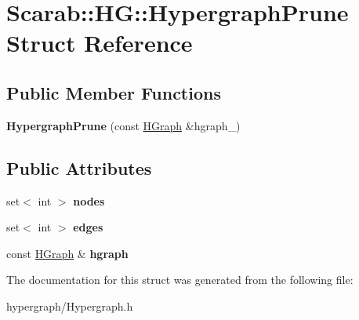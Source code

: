 \hypertarget{struct_scarab_1_1_h_g_1_1_hypergraph_prune}{
\section{Scarab::HG::HypergraphPrune Struct Reference}
\label{struct_scarab_1_1_h_g_1_1_hypergraph_prune}
}
\subsection*{Public Member Functions}
\begin{DoxyCompactItemize}
\item 
\hypertarget{struct_scarab_1_1_h_g_1_1_hypergraph_prune_adc29528f39ad9ced03be8b48341c3e84}{
{\bfseries HypergraphPrune} (const \hyperlink{class_scarab_1_1_h_g_1_1_h_graph}{HGraph} \&hgraph\_\-)}
\label{struct_scarab_1_1_h_g_1_1_hypergraph_prune_adc29528f39ad9ced03be8b48341c3e84}

\end{DoxyCompactItemize}
\subsection*{Public Attributes}
\begin{DoxyCompactItemize}
\item 
\hypertarget{struct_scarab_1_1_h_g_1_1_hypergraph_prune_a1ff0fd7b723f888db33ae542d186d0b4}{
set$<$ int $>$ {\bfseries nodes}}
\label{struct_scarab_1_1_h_g_1_1_hypergraph_prune_a1ff0fd7b723f888db33ae542d186d0b4}

\item 
\hypertarget{struct_scarab_1_1_h_g_1_1_hypergraph_prune_adff9a55407cd2cff9199d440ef513029}{
set$<$ int $>$ {\bfseries edges}}
\label{struct_scarab_1_1_h_g_1_1_hypergraph_prune_adff9a55407cd2cff9199d440ef513029}

\item 
\hypertarget{struct_scarab_1_1_h_g_1_1_hypergraph_prune_a55f12db438013ace2d307efb284bcb7b}{
const \hyperlink{class_scarab_1_1_h_g_1_1_h_graph}{HGraph} \& {\bfseries hgraph}}
\label{struct_scarab_1_1_h_g_1_1_hypergraph_prune_a55f12db438013ace2d307efb284bcb7b}

\end{DoxyCompactItemize}


The documentation for this struct was generated from the following file:\begin{DoxyCompactItemize}
\item 
hypergraph/Hypergraph.h\end{DoxyCompactItemize}
